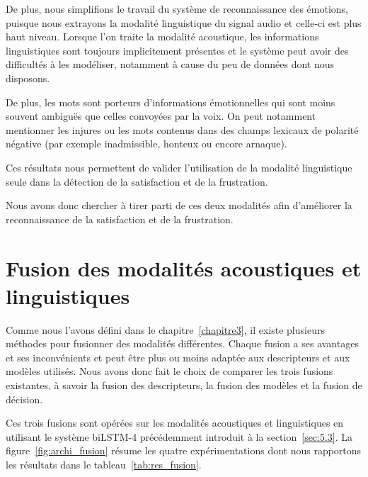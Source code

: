De plus, nous simplifions le travail du système de reconnaissance des émotions, puisque nous extrayons la modalité linguistique du signal audio et celle-ci est plus haut niveau. Lorsque l'on traite la modalité acoustique, les informations linguistiques sont toujours implicitement présentes et le système peut avoir des difficultés à les modéliser, notamment à cause du peu de données dont nous disposons.

De plus, les mots sont porteurs d'informations émotionnelles qui sont moins souvent ambiguës que celles convoyées par la voix. On peut notamment mentionner les injures ou les mots contenus dans des champs lexicaux de polarité négative (par exemple inadmissible, honteux ou encore arnaque).

Ces résultats nous permettent de valider l'utilisation de la modalité linguistique seule dans la détection de la satisfaction et de la frustration.

Nous avons donc chercher à tirer parti de ces deux modalités afin d'améliorer la reconnaissance de la satisfaction et de la frustration.

\section{Fusion des modalités acoustiques et linguistiques}
Comme nous l'avons défini dans le chapitre~\ref{chapitre3}, il existe plusieurs méthodes pour fusionner des modalités différentes. Chaque fusion a ses avantages et ses inconvénients et peut être plus ou moins adaptée aux descripteurs et aux modèles utilisés. Nous avons donc fait le choix de comparer les trois fusions existantes, à savoir la fusion des descripteurs, la fusion des modèles et la fusion de décision.

Ces trois fusions sont opérées sur les modalités acoustiques et linguistiques en utilisant le système biLSTM-4 précédemment introduit à la section~\ref{sec:5.3}. La figure~\ref{fig:archi_fusion} résume les quatre expérimentations dont nous rapportons les résultats dans le tableau~\ref{tab:res_fusion}.



